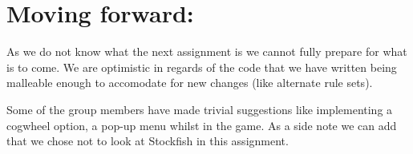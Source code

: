 \documentclass[a4paper, 11pt]{article}
\begin{document}
\section*{Moving forward:}
As we do not know what the next assignment is we cannot fully prepare for what is to come. We are optimistic in regards of the code that we have written being malleable enough to accomodate for new changes (like alternate rule sets).

\vspace{4 mm}
\noindent
Some of the group members have made trivial suggestions like implementing a cogwheel option, a pop-up menu whilst in the game. As a side note we can add that we chose not to look at Stockfish in this assignment.
\end{document}
